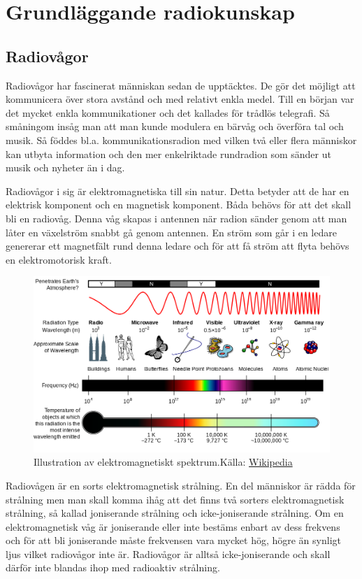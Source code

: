\chapter{Grundläggande radiokunskap}

\section{Radiovågor}

Radiovågor har fascinerat människan sedan de upptäcktes. De gör det möjligt att kommunicera över stora avstånd och med relativt enkla medel. Till en början var det mycket enkla kommunikationer och det kallades för trådlös telegrafi. Så småningom insåg man att man kunde modulera en bärvåg och överföra tal och musik. Så föddes bl.a. kommunikationsradion med vilken två eller flera människor kan utbyta information och den mer enkelriktade rundradion som sänder ut musik och nyheter än i dag.

Radiovågor i sig är elektromagnetiska till sin natur. Detta betyder att de har en elektrisk komponent och en magnetisk komponent. Båda behövs för att det skall bli en radiovåg. Denna våg skapas i antennen när radion sänder genom att man låter en växelström snabbt gå genom antennen. En ström som går i en ledare genererar ett magnetfält rund denna ledare och för att få ström att flyta behövs en elektromotorisk kraft.

\begin{figure}[h]
\includegraphics[width=\textwidth]{img/em-spektrum}
\caption{Illustration av elektromagnetiskt spektrum.Källa: \href{https://commons.wikimedia.org/wiki/File:EM_Spectrum_Properties_edit.svg}{Wikipedia}}
\end{figure}

Radiovågen är en sorts elektromagnetisk strålning. En del människor är rädda för strålning men man skall komma ihåg att det finns två sorters elektromagnetisk strålning, så kallad joniserande strålning och icke-joniserande strålning. Om en elektromagnetisk våg är joniserande eller inte bestäms enbart av dess frekvens och för att bli joniserande måste frekvensen vara mycket hög, högre än synligt ljus vilket radiovågor inte är. Radiovågor är alltså icke-joniserande och skall därför inte blandas ihop med radioaktiv strålning.

